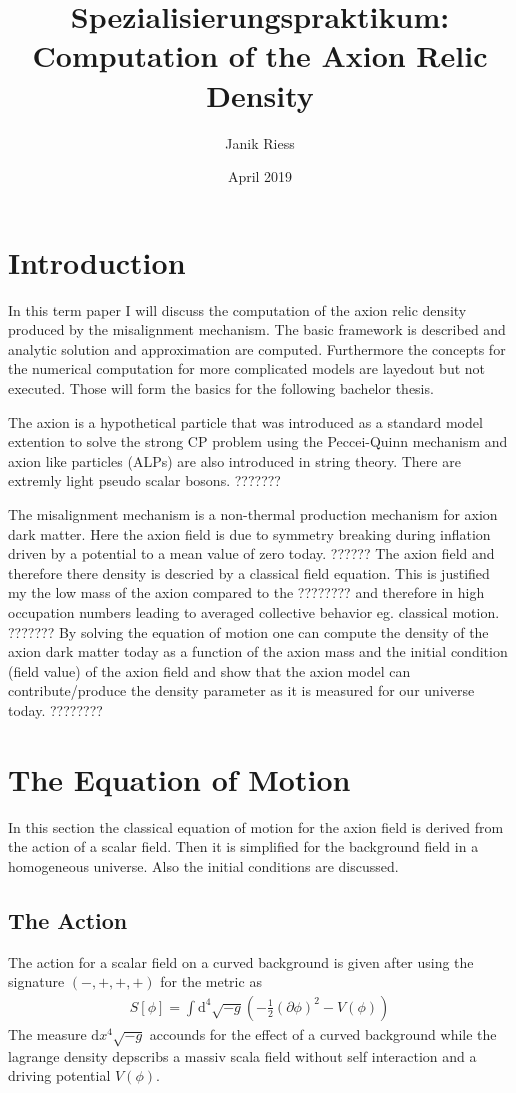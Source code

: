 \documentclass[a4paper]{article}
\title{Spezialisierungspraktikum: \\ Computation of the Axion Relic Density}
\author{Janik Riess }
\date{April 2019}
\begin{document}
\maketitle

\section{Introduction}
In this term paper I will discuss the
computation of the axion relic density produced by the misalignment mechanism. The basic framework is
described and analytic solution and approximation are computed.
Furthermore the concepts for the numerical computation for more complicated models are layedout but not executed. Those will form the basics for the following bachelor thesis.

The axion is a hypothetical particle that was introduced as a standard model
extention to solve the strong CP problem using the Peccei-Quinn mechanism and axion like particles (ALPs) are also
introduced in string theory. There are extremly light pseudo scalar bosons. ???????

The misalignment mechanism is a non-thermal production mechanism for axion dark matter.
Here the axion field is due to symmetry breaking during inflation driven by a potential
to a mean value of zero today. ??????
The axion field and therefore there density is descried by a classical field equation.
This is justified my the low mass of the axion compared to the ????????
and therefore in high occupation numbers leading to averaged collective behavior
eg. classical motion. ???????
By solving the equation of motion one can compute the density of the axion dark matter
today as a function of the axion mass and the initial condition (field value)
of the axion field and show that the axion model can contribute/produce the density parameter as it is measured for our universe today. ????????

\section{The Equation of Motion}
In this section the classical equation of motion for the axion field is derived from the action of a scalar field. Then it is simplified for the background field in a homogeneous universe. Also the initial conditions are discussed.

\subsection{The Action}
The action for a scalar field on a curved background is given after \cite[Chap. 4.1, Page 25]{MarshAxionCosmo}
using the signature $(-, +, +, +)$ for the metric as
\begin{align}
    \label{eq:action}
    S[\phi] = \int \mathrm{d}^4 \sqrt{-g} \left(- \frac{1}{2} (\partial \phi)^2 - V(\phi) \right)
\end{align}
The measure $\mathrm{d}x^4 \sqrt{-g}$ accounds for the effect of a curved background while
the lagrange density depscribs a massiv scala field without self interaction
and a driving potential $V(\phi)$.
\end{document}
